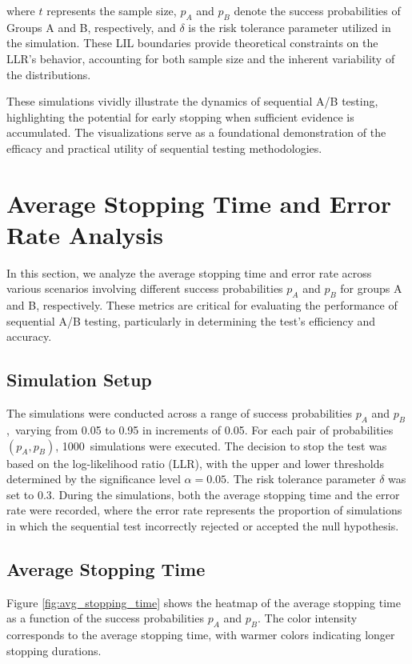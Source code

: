 \documentclass[magisterska, english]{pwr_wmat_praca_dyplomowa}
\theoremstyle{plain}
\numberwithin{theorem}{chapter}
\theoremstyle{definition}
\numberwithin{theorem}{chapter}
\begin{document}
where \( t \) represents the sample size, \( p_A \) and \( p_B \) denote the success probabilities of Groups A and B, respectively, and \( \delta \) is the risk tolerance parameter utilized in the simulation. These LIL boundaries provide theoretical constraints on the LLR's behavior, accounting for both sample size and the inherent variability of the distributions.

These simulations vividly illustrate the dynamics of sequential A/B testing, highlighting the potential for early stopping when sufficient evidence is accumulated. The visualizations serve as a foundational demonstration of the efficacy and practical utility of sequential testing methodologies.

\section{Average Stopping Time and Error Rate Analysis}

In this section, we analyze the average stopping time and error rate across various scenarios involving different success probabilities \( p_A \) and \( p_B \) for groups A and B, respectively. These metrics are critical for evaluating the performance of sequential A/B testing, particularly in determining the test's efficiency and accuracy.

\subsection{Simulation Setup}

The simulations were conducted across a range of success probabilities \( p_A \) and \( p_B \),~varying from 0.05 to 0.95 in increments of 0.05. For each pair of probabilities \( (p_A, p_B) \), 1000~simulations were executed. The decision to stop the test was based on the log-likelihood ratio (LLR), with the upper and lower thresholds determined by the significance level \( \alpha = 0.05 \). The risk tolerance parameter \( \delta \) was set to 0.3. During the simulations, both the average stopping time and the error rate were recorded, where the error rate represents the proportion of simulations in which the sequential test incorrectly rejected or accepted the null hypothesis.

\subsection{Average Stopping Time}

Figure \ref{fig:avg_stopping_time} shows the heatmap of the average stopping time as a function of the success probabilities \( p_A \) and \( p_B \). The color intensity corresponds to the average stopping time, with warmer colors indicating longer stopping durations.
\end{document}
